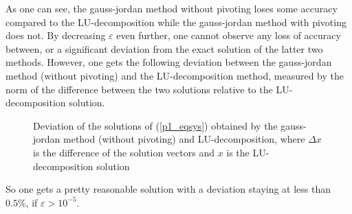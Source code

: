 \documentclass[12pt, a4paper]{article}
\begin{document}
  \noindent
  As one can see, the gauss-jordan method without pivoting loses some accuracy compared to the LU-decomposition while the gauss-jordan method with pivoting does not. By decreasing $\varepsilon$ even further, one cannot observe any loss of accuracy between, or a significant deviation from the exact solution of the latter two methods. However, one gets the following deviation between the gauss-jordan method (without pivoting) and the LU-decomposition method, measured by the norm of the difference between the two solutions relative to the LU-decomposition solution.

  \begin{figure}[ht]
    \begin{center}
      
      \caption{Deviation of the solutions of (\ref{p1_eqsys}) obtained by the gauss-jordan method (without pivoting) and LU-decomposition, where $\Delta x$ is the difference of the solution vectors and $x$ is the LU-decomposition solution}
    \end{center}
  \end{figure}

  \newpage\noindent
  So one gets a pretty reasonable solution with a deviation staying at less than $0.5 \%$, if $\varepsilon > 10^{-5}$.
\end{document}
